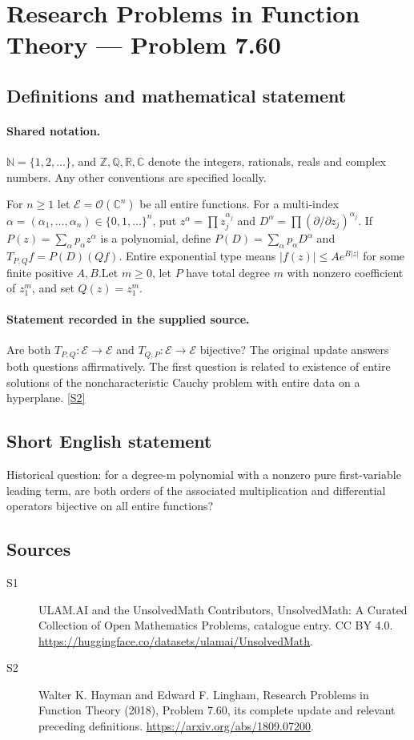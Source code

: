 \documentclass[11pt]{article}
\newcommand{\sref}[2]{\hyperlink{source:#1:#2}{[S#2]}}
\begin{document}
\section{Research Problems in Function Theory — Problem 7.60}\label{statement}

\subsection{Definitions and mathematical statement}

\paragraph{Shared notation.}$\mathbb N=\{1,2,\ldots\}$, and $\mathbb Z,\mathbb Q,\mathbb R,\mathbb C$ denote the integers, rationals, reals and complex numbers. Any other conventions are specified locally.


For $n\ge1$ let $\mathcal E=\mathcal O(\mathbb C^n)$ be all entire functions. For a multi-index $\alpha=(\alpha_1,\ldots,\alpha_n)\in\{0,1,\ldots\}^n$, put $z^\alpha=\prod z_j^{\alpha_j}$ and $D^\alpha=\prod(\partial/\partial z_j)^{\alpha_j}$. If $P(z)=\sum_\alpha p_\alpha z^\alpha$ is a polynomial, define $P(D)=\sum_\alpha p_\alpha D^\alpha$ and $T_{P,Q}f=P(D)(Qf)$. Entire exponential type means $|f(z)|\le A e^{B|z|}$ for some finite positive $A,B$.Let $m\ge0$, let $P$ have total degree $m$ with nonzero coefficient of $z_1^m$, and set $Q(z)=z_1^m$.
\paragraph{Statement recorded in the supplied source.}
Are both $T_{P,Q}:\mathcal E\to\mathcal E$ and $T_{Q,P}:\mathcal E\to\mathcal E$ bijective? The original update answers both questions affirmatively. The first question is related to existence of entire solutions of the noncharacteristic Cauchy problem with entire data on a hyperplane. \sref{statement}{2}
\subsection{Short English statement}
Historical question: for a degree-m polynomial with a nonzero pure first-variable leading term, are both orders of the associated multiplication and differential operators bijective on all entire functions?
\subsection{Sources}
\begin{description}
\item[\hypertarget{source:statement:1}{S1}] ULAM.AI and the UnsolvedMath Contributors, UnsolvedMath: A Curated Collection of Open Mathematics Problems, catalogue entry. CC BY 4.0. \url{https://huggingface.co/datasets/ulamai/UnsolvedMath}.
\item[\hypertarget{source:statement:2}{S2}] Walter K. Hayman and Edward F. Lingham, Research Problems in Function Theory (2018), Problem 7.60, its complete update and relevant preceding definitions. \url{https://arxiv.org/abs/1809.07200}.
\end{description}
\label{end:statement}
\end{document}
